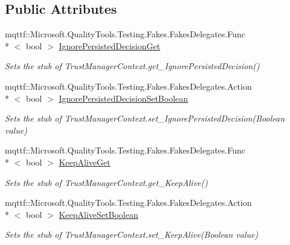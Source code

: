 \subsection*{Public Attributes}
\begin{DoxyCompactItemize}
\item 
mqttf\-::\-Microsoft.\-Quality\-Tools.\-Testing.\-Fakes.\-Fakes\-Delegates.\-Func\\*
$<$ bool $>$ \hyperlink{class_system_1_1_security_1_1_policy_1_1_fakes_1_1_stub_trust_manager_context_a687326499801b4fa2a77955a3db80e31}{Ignore\-Persisted\-Decision\-Get}
\begin{DoxyCompactList}\small\item\em Sets the stub of Trust\-Manager\-Context.\-get\-\_\-\-Ignore\-Persisted\-Decision()\end{DoxyCompactList}\item 
mqttf\-::\-Microsoft.\-Quality\-Tools.\-Testing.\-Fakes.\-Fakes\-Delegates.\-Action\\*
$<$ bool $>$ \hyperlink{class_system_1_1_security_1_1_policy_1_1_fakes_1_1_stub_trust_manager_context_a6d6b9ab43c09f3cfe1afd969bb0b8696}{Ignore\-Persisted\-Decision\-Set\-Boolean}
\begin{DoxyCompactList}\small\item\em Sets the stub of Trust\-Manager\-Context.\-set\-\_\-\-Ignore\-Persisted\-Decision(\-Boolean value)\end{DoxyCompactList}\item 
mqttf\-::\-Microsoft.\-Quality\-Tools.\-Testing.\-Fakes.\-Fakes\-Delegates.\-Func\\*
$<$ bool $>$ \hyperlink{class_system_1_1_security_1_1_policy_1_1_fakes_1_1_stub_trust_manager_context_a386f37aab58db9a4929f05c15785c8da}{Keep\-Alive\-Get}
\begin{DoxyCompactList}\small\item\em Sets the stub of Trust\-Manager\-Context.\-get\-\_\-\-Keep\-Alive()\end{DoxyCompactList}\item 
mqttf\-::\-Microsoft.\-Quality\-Tools.\-Testing.\-Fakes.\-Fakes\-Delegates.\-Action\\*
$<$ bool $>$ \hyperlink{class_system_1_1_security_1_1_policy_1_1_fakes_1_1_stub_trust_manager_context_a701b8f72604ae5dbf078c958f85117a4}{Keep\-Alive\-Set\-Boolean}
\begin{DoxyCompactList}\small\item\em Sets the stub of Trust\-Manager\-Context.\-set\-\_\-\-Keep\-Alive(\-Boolean value)\end{DoxyCompactList}\item 

\end{DoxyCompactItemize}
